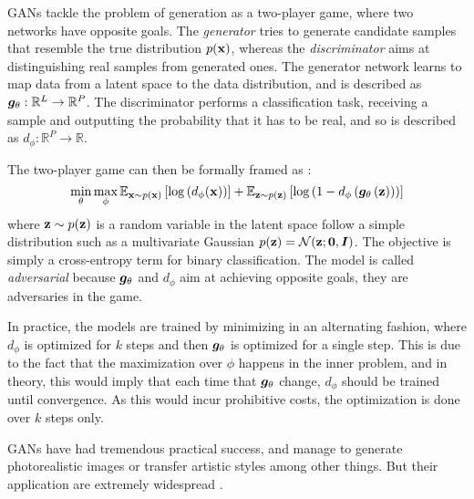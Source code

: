 GANs tackle the problem of generation as a two-player game, where two networks have opposite goals. The \textit{generator} tries to generate candidate samples that resemble the true distribution $p({\mathbf{x}})$, whereas the \textit{discriminator} aims at distinguishing real samples from generated ones. The generator network learns to map data from a latent space to the data distribution, and is described as ${\bm{g}}_\theta: \mathbb{R}^L \to \mathbb{R}^P$. The discriminator performs a classification task, receiving a sample and outputting the probability that it has to be real, and so is described as  $d_\phi: \mathbb{R}^P \to \mathbb{R}$. 

The two-player game can then be formally framed as \citep{goodfellow2014generative}:
\begin{equation}
    \min_\theta \max_\phi \mathbb{E}_{{\mathbf{x}} \sim p({\mathbf{x}})}\left[ \log \left(d_\phi({\mathbf{x}})\right)\right] + \mathbb{E}_{{\mathbf{z}} \sim p({\mathbf{z}})}\left[\log\left(1 - d_\phi\left({\bm{g}}_\theta\left({\mathbf{z}}\right)\right)\right)\right]\label{eq:gan_objective}
\end{equation}
where ${\mathbf{z}} \sim p({\mathbf{z}})$ is a random variable in the latent space follow a simple distribution such as a multivariate Gaussian $p({\mathbf{z}}) = \mathcal{N}({\mathbf{z}};\mathbf{0},{\bm{I}})$. The objective is simply a cross-entropy term for binary classification. The model is called \textit{adversarial} because ${\bm{g}}_\theta$ and $d_\phi$ aim at achieving opposite goals, they are adversaries in the game. %

In practice, the models are trained by minimizing  in an alternating fashion, where $d_\phi$ is optimized for $k$ steps and then ${\bm{g}}_\theta$ is optimized for a single step. This is due to the fact that the maximization over $\phi$ happens in the inner problem, and in theory, this would imply that each time that ${\bm{g}}_\theta$ change, $d_\phi$ should be trained until convergence. As this would incur prohibitive costs, the optimization is done over $k$ steps only. 

GANs have had tremendous practical success, and manage to generate photorealistic images \citep{karras2019style} or transfer artistic styles \citep{isola2017image} among other things. But their application are extremely widespread \citep{goodfellow2016nips,pan2019recent,kazeminia2020gans}.

